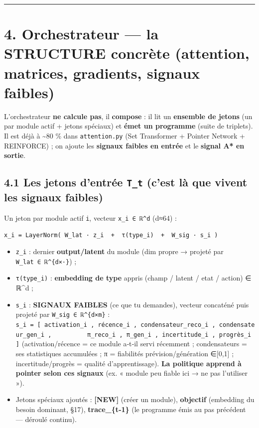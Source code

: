 \documentclass[
  french,
  11pt,
]{article}
\providecommand{\tightlist}{%
  \setlength{\itemsep}{0pt}\setlength{\parskip}{0pt}}
\begin{document}
\begin{center}\rule{0.5\linewidth}{0.5pt}\end{center}

\section{4. Orchestrateur --- la STRUCTURE concrète (attention,
matrices, gradients, signaux
faibles)}\label{orchestrateur-la-structure-concruxe8te-attention-matrices-gradients-signaux-faibles}

L'orchestrateur \textbf{ne calcule pas}, il \textbf{compose} : il lit un
\textbf{ensemble de jetons} (un par module actif + jetons spéciaux) et
\textbf{émet un programme} (suite de triplets). Il est déjà à
\textasciitilde80 \% dans \texttt{attention.py} (Set Transformer +
Pointer Network + REINFORCE) ; on ajoute les \textbf{signaux faibles en
entrée} et le \textbf{signal A* en sortie}.

\subsection{\texorpdfstring{4.1 Les jetons d'entrée \texttt{T\_t} (c'est
là que vivent les signaux
faibles)}{4.1 Les jetons d'entrée T\_t (c'est là que vivent les signaux faibles)}}\label{les-jetons-dentruxe9e-t_t-cest-luxe0-que-vivent-les-signaux-faibles}

Un jeton par module actif \texttt{i}, vecteur \texttt{x\_i\ ∈\ ℝ\^{}d}
(d≈64) :

\begin{verbatim}
x_i = LayerNorm( W_lat · z_i  +  τ(type_i)  +  W_sig · s_i )
\end{verbatim}

\begin{itemize}
\tightlist
\item
  \texttt{z\_i} : dernier \textbf{output/latent} du module (dim propre →
  projeté par \texttt{W\_lat\ ∈\ ℝ\^{}\{d×·\}}) ;
\item
  \texttt{τ(type\_i)} : \textbf{embedding de type} appris (champ /
  latent / etat / action) ∈ ℝ\^{}d ;
\item
  \texttt{s\_i} : \textbf{SIGNAUX FAIBLES} (ce que tu demandes), vecteur
  concaténé puis projeté par \texttt{W\_sig\ ∈\ ℝ\^{}\{d×m\}} :
  \texttt{s\_i\ =\ {[}\ activation\_i\ ,\ récence\_i\ ,\ condensateur\_reco\_i\ ,\ condensateur\_gen\_i\ ,\ \ \ \ \ \ \ \ \ \ π\_reco\_i\ ,\ π\_gen\_i\ ,\ incertitude\_i\ ,\ progrès\_i\ {]}}
  (activation/récence = ce module a‑t‑il servi récemment ; condensateurs
  = ses statistiques accumulées ; π = fiabilités prévision/génération
  ∈{[}0,1{]} ; incertitude/progrès = qualité d'apprentissage).
  \textbf{La politique apprend à pointer selon ces signaux} (ex. «
  module peu fiable ici → ne pas l'utiliser »).
\item
  Jetons spéciaux ajoutés : \textbf{{[}NEW{]}} (créer un module),
  \textbf{objectif} (embedding du besoin dominant, §17),
  \textbf{trace\_\{t‑1\}} (le programme émis au pas précédent ---
  déroulé continu).
\end{itemize}
\end{document}
